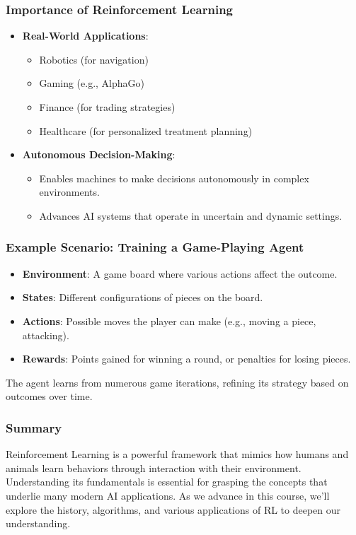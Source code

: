 \documentclass[aspectratio=169]{beamer}
\begin{document}
\begin{frame}[fragile]
    \frametitle{Importance of Reinforcement Learning}
    \begin{itemize}
        \item \textbf{Real-World Applications}:
            \begin{itemize}
                \item Robotics (for navigation)
                \item Gaming (e.g., AlphaGo)
                \item Finance (for trading strategies)
                \item Healthcare (for personalized treatment planning)
            \end{itemize}
        \item \textbf{Autonomous Decision-Making}:
            \begin{itemize}
                \item Enables machines to make decisions autonomously in complex environments.
                \item Advances AI systems that operate in uncertain and dynamic settings.
            \end{itemize}
    \end{itemize}
\end{frame}

\begin{frame}[fragile]
    \frametitle{Example Scenario: Training a Game-Playing Agent}
    \begin{itemize}
        \item \textbf{Environment}: A game board where various actions affect the outcome.
        \item \textbf{States}: Different configurations of pieces on the board.
        \item \textbf{Actions}: Possible moves the player can make (e.g., moving a piece, attacking).
        \item \textbf{Rewards}: Points gained for winning a round, or penalties for losing pieces.
    \end{itemize}
    The agent learns from numerous game iterations, refining its strategy based on outcomes over time.
\end{frame}

\begin{frame}[fragile]
    \frametitle{Summary}
    Reinforcement Learning is a powerful framework that mimics how humans and animals learn behaviors through interaction with their environment. 
    Understanding its fundamentals is essential for grasping the concepts that underlie many modern AI applications. 
    As we advance in this course, we'll explore the history, algorithms, and various applications of RL to deepen our understanding.
\end{frame}
\end{document}
